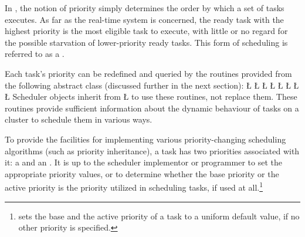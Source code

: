 \documentclass[openright,twoside]{report}
\begin{document}
In \uC, the notion of priority simply determines the order by which a set of tasks executes.
As far as the real-time system is concerned, the ready task with the highest priority is the most eligible task to execute, with little or no regard for the possible starvation of lower-priority ready tasks.
This form of scheduling is referred to as a .

Each task's priority can be redefined and queried by the routines provided from the following abstract class (discussed further in the next section):
\LGinlinefalse\LGbegin\lgrinde
\L{}
\L{}
\L{\LB{}}
\L{\LB{}}
\L{\LB{}}
\L{\LB{}}
\L{\LB{}}
\L{}
\CE{}\endlgrinde\LGend
{}%
%
%
%
%
Scheduler objects inherit from \LGinlinetrue\LGbegin\lgrinde\L{}\endlgrinde\LGend{} to use these routines, not replace them.
These routines provide sufficient information about the dynamic behaviour of tasks on a cluster to schedule them in various ways.

To provide the facilities for implementing various priority-changing scheduling algorithms (such as priority inheritance), a \uC task has two priorities associated with it: a  and an .
It is up to the scheduler implementor or programmer to set the appropriate priority values, or to determine whether the base priority or the active priority is the priority utilized in scheduling tasks, if used at all.\footnote{\uC sets the base and the active priority of a task to a uniform default value, if no other priority is specified.}
\end{document}
